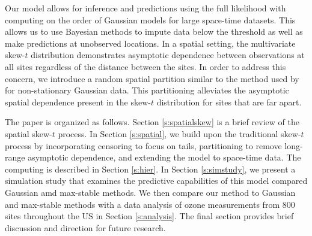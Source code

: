 \documentclass[useAMS,usenatbib,referee]{biom}
\begin{document}
Our model allows for inference and predictions using the full likelihood with computing on the order of Gaussian models for large space-time datasets.
This allows us to use Bayesian methods to impute data below the threshold as well as make predictions at unobserved locations.
In a spatial setting, the multivariate skew-$t$ distribution demonstrates asymptotic dependence between observations at all sites regardless of the distance between the sites.
In order to address this concern, we introduce a random spatial partition similar to the method used by \citet{Kim2005} for non-stationary Gaussian data.
This partitioning alleviates the asymptotic spatial dependence present in the skew-$t$ distribution for sites that are far apart.

The paper is organized as follows.
Section \ref{s:spatialskew} is a brief review of the spatial skew-$t$ process.
In Section \ref{s:spatial}, we build upon the traditional skew-$t$ process by incorporating censoring to focus on tails, partitioning to remove long-range asymptotic dependence, and extending the model to space-time data.
The computing is described in Section \ref{s:hier}.
In Section \ref{s:simstudy}, we present a simulation study that examines the predictive capabilities of this model compared Gaussian amd max-stable methods.
We then compare our method to Gaussian and max-stable methods with a data analysis of ozone measurements from 800 sites throughout the US in Section \ref{s:analysis}.
The final section provides brief discussion and direction for future research.


\end{document}
